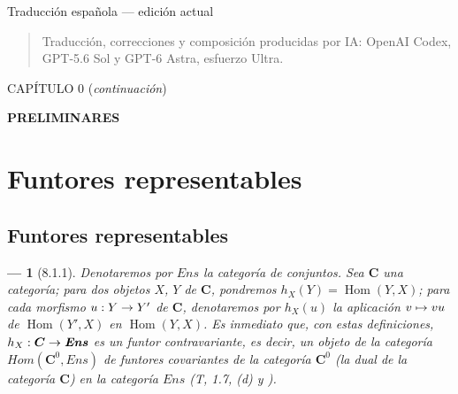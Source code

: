 \documentclass[10pt,oneside,openany]{book}
\makeatletter
\theoremstyle{egaenv}\newtheorem*{env}{---}
\theoremstyle{egastatement}
\theoremstyle{egadescription}
\newcommand{\oldpage}[2][]{\marginnote{\normalfont\scriptsize\textbf{#1}\,|\,#2}\ignorespaces}
\let\ega@shortmapsto\mapsto
\renewcommand{\to}{\mathchoice{\longrightarrow}{\rightarrow}{\rightarrow}{\rightarrow}}
\renewcommand{\mapsto}{\mathchoice{\longmapsto}{\ega@shortmapsto}{\ega@shortmapsto}{\ega@shortmapsto}}
\makeatother
\begin{document}
\begin{center}
\large Traducción española — edición actual
\end{center}

\begin{quote}\small
Traducción, correcciones y composición producidas por IA: OpenAI Codex, GPT-5.6 Sol y GPT-6 Astra, esfuerzo Ultra.
\end{quote}

\clearpage
\thispagestyle{plain}
\oldpage[0\textsubscript{III}]{5}
\label{chapter:0III-fr}

\begin{center}
{\large CAPÍTULO 0 (\textit{continuación})\footnotemark\par}
\vspace{1.5em}
{\Large\bfseries PRELIMINARES\par}
\end{center}


\setcounter{section}{7}


\section{Funtores representables}
\label{section:0.8}
\label{section:0.8-fr}

\subsection{Funtores representables}
\label{subsection:0.8.1}
\label{subsection:0.8.1-fr}


\begin{env}[8.1.1]
\label{0.8.1.1}
\label{0.8.1.1-fr}
Denotaremos por $\boldsymbol{\mathit{Ens}}$ la categoría de conjuntos.
Sea $\boldsymbol{C}$ una categoría; para dos objetos $X$, $Y$ de $\boldsymbol{C}$, pondremos $h_X(Y)=\operatorname{Hom}(Y,X)$; para cada morfismo $u:Y\to Y'$ de $\boldsymbol{C}$, denotaremos por $h_X(u)$ la aplicación $v\mapsto vu$ de $\operatorname{Hom}(Y',X)$ en $\operatorname{Hom}(Y,X)$.
Es inmediato que, con estas definiciones, $h_X:\boldsymbol{C}\to\boldsymbol{\mathit{Ens}}$ es un \emph{funtor contravariante}, es decir, un objeto de la categoría $\boldsymbol{\mathit{Hom}}(\boldsymbol{C}^0,\boldsymbol{\mathit{Ens}})$ de funtores covariantes de la categoría $\boldsymbol{C}^0$ (la dual de la categoría $\boldsymbol{C}$) en la categoría $\boldsymbol{\mathit{Ens}}$ (T, 1.7, (\textit{d}) y \cite{III-29}).
\end{env}
\end{document}
